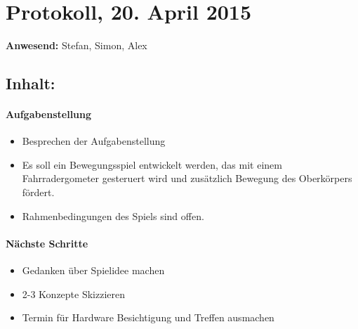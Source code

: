 \documentclass[a4paper,11pt]{article}
\begin{document}
\section*{Protokoll, 20. April 2015}

\textbf{Anwesend:} Stefan, Simon, Alex

\subsection*{Inhalt:}
\paragraph{Aufgabenstellung}
\begin{itemize}
  \item Besprechen der Aufgabenstellung
  \item Es soll ein Bewegungsspiel entwickelt werden, das mit einem Fahrradergometer gesteruert wird und zusätzlich Bewegung des Oberkörpers fördert.
  \item Rahmenbedingungen des Spiels sind offen.
\end{itemize}

\paragraph{Nächste Schritte}
\begin{itemize}
  \item Gedanken über Spielidee machen
  \item 2-3 Konzepte Skizzieren
  \item Termin für Hardware Besichtigung und Treffen ausmachen
\end{itemize}
\end{document}
